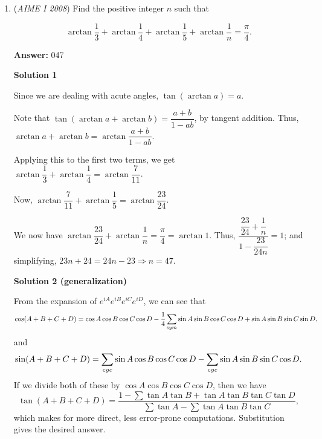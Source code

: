 \begin{enumerate}
 Then the first $26$ sets ($S_0,\cdots S_{25}$) each have at least one perfect square because the differences between consecutive squares in them are all less than $100$. Also, since $316$ is the largest $x$ such that $x^2 < 100000$ ($100000$ is the upper bound which all numbers in $S_{999}$ must be less than), there are $316 - 50 = 266$ other sets after $S_{25}$ that have a perfect square.

 There are $1000 - 266 - 26 = \boxed{708}$ sets without a perfect square.

 


	\item (\textit{AIME I 2008}) Find the positive integer $n$ such that 


 
 \[\arctan\frac {1}{3} + \arctan\frac {1}{4} + \arctan\frac {1}{5} + \arctan\frac {1}{n} = \frac {\pi}{4}.\]

 \textbf{Answer: }047



\textbf{Solution 1}

Since we are dealing with acute angles, $\tan(\arctan{a}) = a$.

 Note that $\tan(\arctan{a} + \arctan{b}) = \dfrac{a + b}{1 - ab}$, by tangent addition. Thus, $\arctan{a} + \arctan{b} = \arctan{\dfrac{a + b}{1 - ab}}$.

 Applying this to the first two terms, we get $\arctan{\dfrac{1}{3}} + \arctan{\dfrac{1}{4}} = \arctan{\dfrac{7}{11}}$.

 Now, $\arctan{\dfrac{7}{11}} + \arctan{\dfrac{1}{5}} = \arctan{\dfrac{23}{24}}$.

 We now have $\arctan{\dfrac{23}{24}} + \arctan{\dfrac{1}{n}} = \dfrac{\pi}{4} = \arctan{1}$. Thus, $\dfrac{\dfrac{23}{24} + \dfrac{1}{n}}{1 - \dfrac{23}{24n}} = 1$; and simplifying, $23n + 24 = 24n - 23 \Longrightarrow n = \boxed{47}$.

 



\textbf{Solution 2 (generalization)}

From the expansion of $e^{iA}e^{iB}e^{iC}e^{iD}$, we can see that
 \[\cos(A + B + C + D) = \cos A \cos B \cos C \cos D - \frac{1}{4} \sum_{\textrm sym} \sin A \sin B \cos C \cos D + \sin A \sin B \sin C \sin D,\]and
 \[\sin(A + B + C + D) = \sum_{\textrm cyc}\sin A \cos B \cos C \cos D - \sum_{\textrm cyc} \sin A \sin B \sin C \cos D .\]If we divide both of these by $\cos A \cos B \cos C \cos D$, then we have
 \[\tan(A + B + C + D) = \frac {1 - \sum \tan A \tan B + \tan A \tan B \tan C \tan D}{\sum \tan A - \sum \tan A \tan B \tan C},\]which makes for more direct, less error-prone computations. Substitution gives the desired answer.


\end{enumerate}
